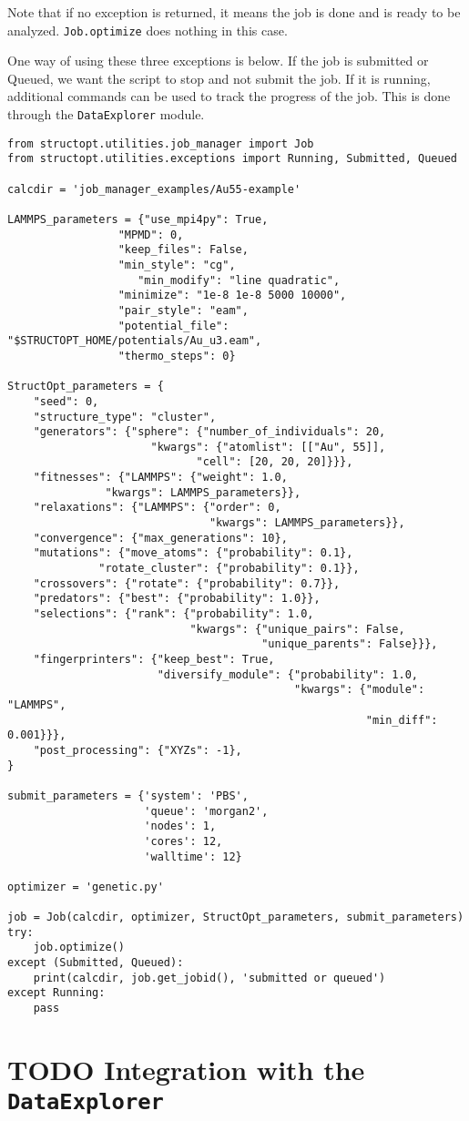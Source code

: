 \documentclass[11pt]{article}
\begin{document}
Note that if no exception is returned, it means the job is done and is ready to be analyzed. \texttt{Job.optimize} does nothing in this case.

One way of using these three exceptions is below. If the job is submitted or Queued, we want the script to stop and not submit the job. If it is running, additional commands can be used to track the progress of the job. This is done through the \texttt{DataExplorer} module.

\begin{verbatim}
from structopt.utilities.job_manager import Job
from structopt.utilities.exceptions import Running, Submitted, Queued

calcdir = 'job_manager_examples/Au55-example'

LAMMPS_parameters = {"use_mpi4py": True,
	             "MPMD": 0,
	             "keep_files": False,
	             "min_style": "cg",
                    "min_modify": "line quadratic",
	             "minimize": "1e-8 1e-8 5000 10000",
	             "pair_style": "eam",
	             "potential_file": "$STRUCTOPT_HOME/potentials/Au_u3.eam",
	             "thermo_steps": 0}

StructOpt_parameters = {
    "seed": 0,
    "structure_type": "cluster",
    "generators": {"sphere": {"number_of_individuals": 20,
		              "kwargs": {"atomlist": [["Au", 55]],
			                 "cell": [20, 20, 20]}}},
    "fitnesses": {"LAMMPS": {"weight": 1.0,
	           "kwargs": LAMMPS_parameters}},
    "relaxations": {"LAMMPS": {"order": 0,
                               "kwargs": LAMMPS_parameters}},
    "convergence": {"max_generations": 10},
    "mutations": {"move_atoms": {"probability": 0.1},
	          "rotate_cluster": {"probability": 0.1}},
    "crossovers": {"rotate": {"probability": 0.7}},
    "predators": {"best": {"probability": 1.0}},
    "selections": {"rank": {"probability": 1.0,
                            "kwargs": {"unique_pairs": False,
                                       "unique_parents": False}}},
    "fingerprinters": {"keep_best": True,
                       "diversify_module": {"probability": 1.0,
                                            "kwargs": {"module": "LAMMPS",
                                                       "min_diff": 0.001}}},
    "post_processing": {"XYZs": -1},
}

submit_parameters = {'system': 'PBS',
                     'queue': 'morgan2',
                     'nodes': 1,
                     'cores': 12,
                     'walltime': 12}

optimizer = 'genetic.py'

job = Job(calcdir, optimizer, StructOpt_parameters, submit_parameters)
try:
    job.optimize()
except (Submitted, Queued):
    print(calcdir, job.get_jobid(), 'submitted or queued')
except Running:
    pass
\end{verbatim}
\section{{\bfseries\sffamily TODO} Integration with the \texttt{DataExplorer}}
\label{sec:orgheadline7}
\end{document}
